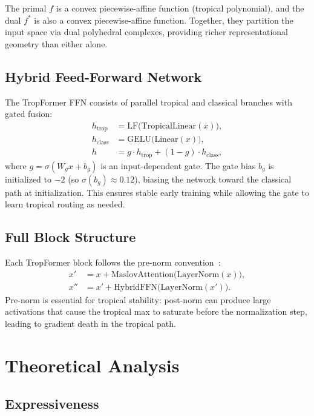 \documentclass[11pt,twocolumn]{article}
\begin{document}
The primal $f$ is a convex piecewise-affine function (tropical polynomial),
and the dual $f^*$ is also a convex piecewise-affine function. Together, they
partition the input space via dual polyhedral complexes, providing richer
representational geometry than either alone.

\subsection{Hybrid Feed-Forward Network}

The TropFormer FFN consists of parallel tropical and classical branches
with gated fusion:
\begin{align}
  h_\text{trop} &= \text{LF}\bigl(\text{TropicalLinear}(x)\bigr), \\
  h_\text{class} &= \text{GELU}\bigl(\text{Linear}(x)\bigr), \\
  h &= g \cdot h_\text{trop} + (1-g) \cdot h_\text{class},
\end{align}
where $g = \sigma(W_g x + b_g)$ is an input-dependent gate. The gate bias
$b_g$ is initialized to $-2$ (so $\sigma(b_g) \approx 0.12$), biasing the
network toward the classical path at initialization. This ensures stable
early training while allowing the gate to learn tropical routing as needed.

\subsection{Full Block Structure}

Each TropFormer block follows the pre-norm
convention~\cite{xiong2020layer}:
\begin{align}
  x' &= x + \text{MaslovAttention}\bigl(\text{LayerNorm}(x)\bigr), \\
  x'' &= x' + \text{HybridFFN}\bigl(\text{LayerNorm}(x')\bigr).
\end{align}
Pre-norm is essential for tropical stability: post-norm can produce large
activations that cause the tropical max to saturate before the normalization
step, leading to gradient death in the tropical path.

\section{Theoretical Analysis}\label{sec:theory}

\subsection{Expressiveness}
\end{document}
